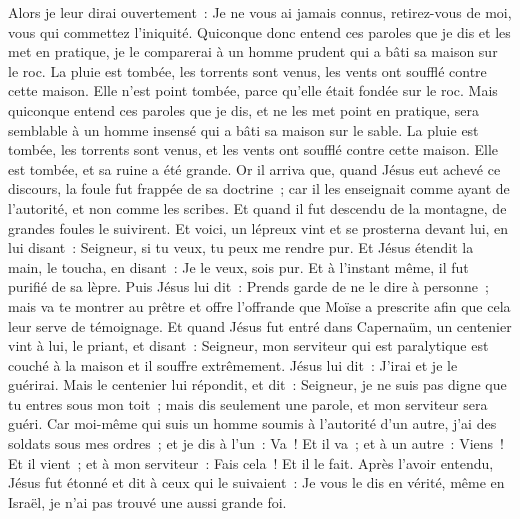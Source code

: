 \begin{multicols}{2}
Alors je leur dirai ouvertement~: Je ne vous ai jamais connus, retirez-vous de moi, vous qui commettez l'iniquité.
Quiconque donc entend ces paroles que je dis et les met en pratique, je le comparerai à un homme prudent qui a bâti sa maison sur le roc.
La pluie est tombée, les torrents sont venus, les vents ont soufflé contre cette maison. Elle n'est point tombée, parce qu'elle était fondée sur le roc.
Mais quiconque entend ces paroles que je dis, et ne les met point en pratique, sera semblable à un homme insensé qui a bâti sa maison sur le sable.
La pluie est tombée, les torrents sont venus, et les vents ont soufflé contre cette maison. Elle est tombée, et sa ruine a été grande.
Or il arriva que, quand Jésus eut achevé ce discours, la foule fut frappée de sa doctrine~;
car il les enseignait comme ayant de l'autorité, et non comme les scribes.
\VerseOne{}Et quand il fut descendu de la montagne, de grandes foules le suivirent.
Et voici, un lépreux vint et se prosterna devant lui, en lui disant~: Seigneur, si tu veux, tu peux me rendre pur.
Et Jésus étendit la main, le toucha, en disant~: Je le veux, sois pur. Et à l'instant même, il fut purifié de sa lèpre.
Puis Jésus lui dit~: Prends garde de ne le dire à personne~; mais va te montrer au prêtre et offre l'offrande que Moïse a prescrite afin que cela leur serve de témoignage.
Et quand Jésus fut entré dans Capernaüm, un centenier vint à lui, le priant,
et disant~: Seigneur, mon serviteur qui est paralytique est couché à la maison et il souffre extrêmement.
Jésus lui dit~: J'irai et je le guérirai.
Mais le centenier lui répondit, et dit~: Seigneur, je ne suis pas digne que tu entres sous mon toit~; mais dis seulement une parole, et mon serviteur sera guéri.
Car moi-même qui suis un homme soumis à l'autorité d'un autre, j'ai des soldats sous mes ordres~; et je dis à l'un~: Va~! Et il va~; et à un autre~: Viens~! Et il vient~; et à mon serviteur~: Fais cela~! Et il le fait.
Après l'avoir entendu, Jésus fut étonné et dit à ceux qui le suivaient~: Je vous le dis en vérité, même en Israël, je n'ai pas trouvé une aussi grande foi.

\end{multicols}
